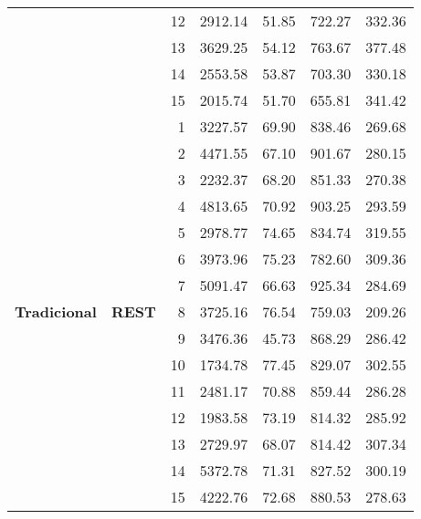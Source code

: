 \begin{longtable}{@{} llrrrrr @{}}
        & & 12 & 2912.14 & 51.85 & 722.27 & 332.36 \\
        & & 13 & 3629.25 & 54.12 & 763.67 & 377.48 \\
        & & 14 & 2553.58 & 53.87 & 703.30 & 330.18 \\
        & & 15 & 2015.74 & 51.70 & 655.81 & 341.42 \\
    \cline{2-7}
    \multirow{15}{*}{\textbf{Tradicional}} & \multirow{15}{*}{\textbf{REST}} 
        & 1 & 3227.57 & 69.90 & 838.46 & 269.68 \\
        & & 2 & 4471.55 & 67.10 & 901.67 & 280.15 \\
        & & 3 & 2232.37 & 68.20 & 851.33 & 270.38 \\
        & & 4 & 4813.65 & 70.92 & 903.25 & 293.59 \\
        & & 5 & 2978.77 & 74.65 & 834.74 & 319.55 \\
        & & 6 & 3973.96 & 75.23 & 782.60 & 309.36 \\
        & & 7 & 5091.47 & 66.63 & 925.34 & 284.69 \\
        & & 8 & 3725.16 & 76.54 & 759.03 & 209.26 \\
        & & 9 & 3476.36 & 45.73 & 868.29 & 286.42 \\
        & & 10 & 1734.78 & 77.45 & 829.07 & 302.55 \\
        & & 11 & 2481.17 & 70.88 & 859.44 & 286.28 \\
        & & 12 & 1983.58 & 73.19 & 814.32 & 285.92 \\
        & & 13 & 2729.97 & 68.07 & 814.42 & 307.34 \\
        & & 14 & 5372.78 & 71.31 & 827.52 & 300.19 \\
        & & 15 & 4222.76 & 72.68 & 880.53 & 278.63 \\
    \hline


\end{longtable}
